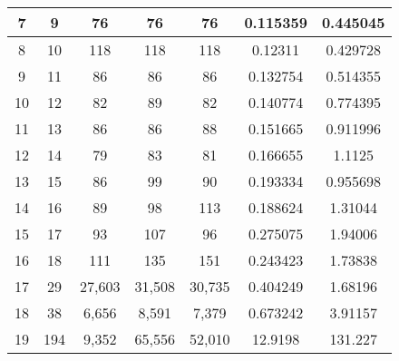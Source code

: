 \documentclass[conference]{IEEEtran}
\begin{document}
\begin{table*}[ht]
\begin{tabular}{|c|c|c|c|c|c|c|}
        7                  & 9                      & 76                      & 76                         & 76                           & 0.115359             & 0.445045               \\ \hline
        8                  & 10                     & 118                     & 118                        & 118                          & 0.12311              & 0.429728               \\ \hline
        9                  & 11                     & 86                      & 86                         & 86                           & 0.132754             & 0.514355               \\ \hline
        10                 & 12                     & 82                      & 89                         & 82                           & 0.140774             & 0.774395               \\ \hline
        11                 & 13                     & 86                      & 86                         & 88                           & 0.151665             & 0.911996               \\ \hline
        12                 & 14                     & 79                      & 83                         & 81                           & 0.166655             & 1.1125                 \\ \hline
        13                 & 15                     & 86                      & 99                         & 90                           & 0.193334             & 0.955698               \\ \hline
        14                 & 16                     & 89                      & 98                         & 113                          & 0.188624             & 1.31044                \\ \hline
        15                 & 17                     & 93                      & 107                        & 96                           & 0.275075             & 1.94006                \\ \hline
        16                 & 18                     & 111                     & 135                        & 151                          & 0.243423             & 1.73838                \\ \hline
        17                 & 29                     & 27,603                  & 31,508                     & 30,735                       & 0.404249             & 1.68196                \\ \hline
        18                 & 38                     & 6,656                   & 8,591                      & 7,379                        & 0.673242             & 3.91157                \\ \hline
        19                 & 194                    & 9,352                   & 65,556                     & 52,010                       & 12.9198              & 131.227                \\ \hline
    \end{tabular}
    \label{tab:summary_results}
\end{table*}
\end{document}
